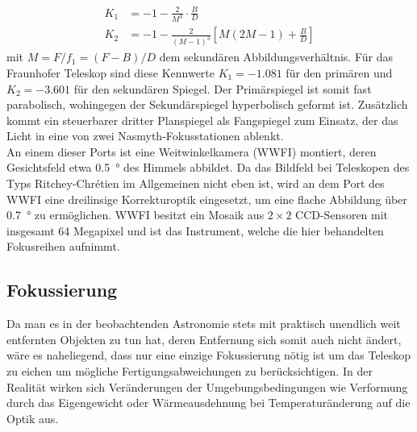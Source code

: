 \begin{align}
	K_1 &= -1-\frac{2}{M^3}\cdot\frac{B}{D}\\
    K_2 &= -1-\frac{2}{\left( M-1\right)^3}\left[ M\left( 2M-1\right) +\frac{B}{D}\right]
\end{align}
mit $M=F/f_1=(F-B)/D$ dem sekundären Abbildungsverhältnis. Für das Fraunhofer Teleskop sind diese Kennwerte $K_1=\num{-1.081}$ für den primären und $K_2=\num{-3.601}$ für den sekundären Spiegel\cite{fraunhofer}. Der Primärspiegel ist somit fast parabolisch, wohingegen der Sekundärspiegel hyperbolisch geformt ist. Zusätzlich kommt ein steuerbarer dritter Planspiegel als Fangspiegel zum Einsatz, der das Licht in eine von zwei Nasmyth-Fokusstationen ablenkt.\\
An einem dieser Ports ist eine Weitwinkelkamera (WWFI\cite{wwfi}) montiert, deren Gesichtsfeld etwa \SI{0.5}{\degree} des Himmels abbildet. Da das Bildfeld bei Teleskopen des Typs Ritchey-Chrétien im Allgemeinen nicht eben ist, wird an dem Port des WWFI eine dreilinsige Korrekturoptik eingesetzt, um eine flache Abbildung über \SI{0.7}{\degree} zu ermöglichen. WWFI besitzt ein Mosaik aus $2\times 2$ CCD-Sensoren mit insgesamt 64 Megapixel und ist das Instrument, welche die hier behandelten Fokusreihen aufnimmt.

\subsection{Fokussierung}

Da man es in der beobachtenden Astronomie stets mit praktisch unendlich weit entfernten Objekten zu tun hat, deren Entfernung sich somit auch nicht ändert, wäre es naheliegend, dass nur eine einzige Fokussierung nötig ist um das Teleskop zu eichen um mögliche Fertigungsabweichungen zu berücksichtigen. In der Realität wirken sich Veränderungen der Umgebungsbedingungen wie Verformung durch das Eigengewicht oder Wärmeausdehnung bei Temperaturänderung auf die Optik aus.\\

